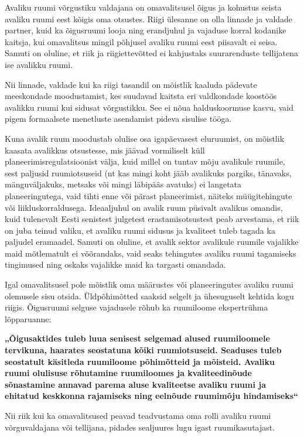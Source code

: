 \documentclass[estonian,]{article}
\begin{document}
Avaliku ruumi võrgustiku valdajana on omavalitsusel õigus ja kohustus seista avaliku ruumi eest kõigis oma otsustes. Riigi ülesanne on olla linnade ja valdade partner, kuid ka õigusruumi looja ning erandjuhul ja vajaduse korral kodanike kaitsja, kui omavalitsus mingil põhjusel avaliku ruumi eest piisavalt ei seisa. Samuti on oluline, et riik ja riigiettevõtted ei kahjustaks suurarenduste tellijatena ise avalikku ruumi.

Nii linnade, valdade kui ka riigi tasandil on mõistlik kaaluda pädevate meeskondade moodustamist, kes suudavad kaitsta eri valdkondade koostöös avalikku ruumi kui sidusat võrgustikku. See ei nõua halduskoormuse kasvu, vaid pigem formaalsete menetluste asendamist pideva sisulise tööga.

Kuna avalik ruum moodustab olulise osa igapäevasest eluruumist, on mõistlik kaasata avalikkus otsustesse, mis jäävad vormiliselt küll planeerimisregulatsioonist välja, kuid millel on tuntav mõju avalikule ruumile, sest paljusid ruumiotsuseid (nt kas mingi koht jääb avalikuks pargiks, tänavaks, mänguväljakuks, metsaks või mingi läbipääs avatuks) ei langetata planeeringutega, vaid tihti enne või pärast planeerimist, näiteks müügitehingute või liikluskorraldusega. Ideaaljuhul on avalik ruum püsivalt avalikus omandis, kuid tulenevalt Eesti senistest julgetest erastamisotsustest peab arvestama, et riik on juba teinud valiku, et avaliku ruumi sidusus ja kvaliteet tuleb tagada ka paljudel eramaadel. Samuti on oluline, et avalik sektor avalikule ruumile vajalikke maid mõtlematult ei võõrandaks, vaid seaks tehingutes avaliku ruumi tagamiseks tingimused ning oskaks vajalikke maid ka targasti omandada.

Igal omavalitsusel pole mõistlik oma määrustes või planeeringutes avaliku ruumi olemusele sisu otsida. Üldpõhimõtted saaksid selgelt ja ühesuguselt kehtida kogu riigis. Õigusruumi selguse vajadusele rõhub ka ruumiloome ekspertrühma lõpparuanne:

\textbf{„Õigusaktides tuleb luua senisest selgemad alused ruumiloomele tervikuna, haarates seostatuna kõiki ruumiotsuseid. Seaduses tuleb seostatult käsitleda ruumiloome põhimõtteid ja mõisteid. Avaliku ruumi olulisuse rõhutamine ruumiloomes ja kvaliteedinõude sõnastamine annavad parema aluse kvaliteetse avaliku ruumi ja ehitatud keskkonna rajamiseks ning eelnõude ruumimõju hindamiseks``}

Nii riik kui ka omavalitsused peavad teadvustama oma rolli avaliku ruumi võrguvaldajana või tellijana, pidades sealjuures lugu igast ruumikasutajast.
\end{document}
